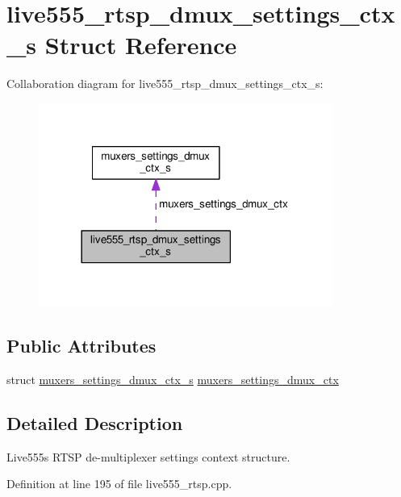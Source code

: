 \hypertarget{structlive555__rtsp__dmux__settings__ctx__s}{}\section{live555\+\_\+rtsp\+\_\+dmux\+\_\+settings\+\_\+ctx\+\_\+s Struct Reference}
\label{structlive555__rtsp__dmux__settings__ctx__s}


Collaboration diagram for live555\+\_\+rtsp\+\_\+dmux\+\_\+settings\+\_\+ctx\+\_\+s\+:\nopagebreak
\begin{figure}[H]
\begin{center}
\leavevmode
\includegraphics[width=273pt]{structlive555__rtsp__dmux__settings__ctx__s__coll__graph}
\end{center}
\end{figure}
\subsection*{Public Attributes}
\begin{DoxyCompactItemize}
\item 
struct \hyperlink{structmuxers__settings__dmux__ctx__s}{muxers\+\_\+settings\+\_\+dmux\+\_\+ctx\+\_\+s} \hyperlink{structlive555__rtsp__dmux__settings__ctx__s_af1c689c7f424a63ac4f5fa09d1832c15}{muxers\+\_\+settings\+\_\+dmux\+\_\+ctx}
\end{DoxyCompactItemize}


\subsection{Detailed Description}
Live555\textquotesingle{}s R\+T\+SP de-\/multiplexer settings context structure. 

Definition at line 195 of file live555\+\_\+rtsp.\+cpp.



